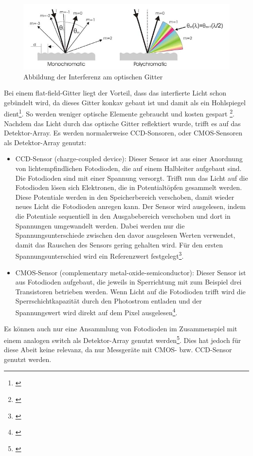 \begin{figure}[htp]     %
\centering
\includegraphics[width=1.0\textwidth]{bilder/spek1} 
\caption {Abbildung der Interferenz am optischen Gitter \protect\footnotemark}\label{b_spek1}
\end{figure}

Bei einem flat-field-Gitter liegt der Vorteil, dass das interfierte Licht schon gebündelt wird, da dieses Gitter konkav gebaut ist und damit als ein Hohlspiegel dient\footnote{\cite{wiki}}. So werden weniger optische Elemente gebraucht und kosten gespart \footnote{\cite[7]{jeti}}.\\
Nachdem das Licht durch das optische Gitter reflektiert wurde, trifft es auf das Detektor-Array. Es werden normalerweise CCD-Sonsoren, oder CMOS-Sensoren als Detektor-Array genutzt:

\begin{itemize}
\item CCD-Sensor (charge-coupled device): Dieser Sensor ist aus einer Anordnung von lichtempfindlichen Fotodioden, die auf einem Halbleiter aufgebaut sind. Die Fotodioden sind mit einer Spannung versorgt. Trifft nun das Licht auf die Fotodioden lösen sich Elektronen, die in Potentialtöpfen gesammelt werden. Diese Potentiale werden in den Speicherbereich verschoben, damit wieder neues Licht die Fotodioden anregen kann. Der Sensor wird ausgelesen, indem die Potentiale sequentiell in den Ausgabebereich verschoben und dort in Spannungen umgewandelt werden. Dabei werden nur die Spannungsunterschiede zwischen den davor ausgelesen Werten verwendet, damit das Rauschen des Sensors gering gehalten wird. Für den ersten Spannungsunterschied wird ein Referenzwert festgelegt\footnote{\cite[17]{jeti}}.

\item CMOS-Sensor (complementary metal-oxide-semiconductor): Dieser Sensor ist aus Fotodioden aufgebaut, die jeweils in Sperrichtung mit zum Beispiel drei Transistoren betrieben werden. Wenn Licht auf die Fotodioden trifft wird die Sperrschichtkapazität durch den Photostrom entladen und der Spannungswert wird direkt auf dem Pixel ausgelesen\footnote{\cite[369]{schmidt}}.

\end{itemize}
Es können auch nur eine Ansammlung von Fotodioden im Zusammenspiel mit einem analogen switch als Detektor-Array genutzt werden\footnote{\cite[18]{jeti}}. Dies hat jedoch für diese Abeit keine relevanz, da nur Messgeräte mit CMOS- bzw. CCD-Sensor genutzt werden.\\

